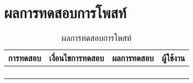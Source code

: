 \section{ผลการทดสอบการโพสท์}
\begin{table}[H]
	\caption{ผลการทดสอบการโพสท์}
    \centering	
	\label{tab:test10}
    \begin{tabular}{ | p{4cm} | p{4cm} | p{4cm} | p{2cm} | }
		\hline
	\multicolumn{1}{|c|}{การทดสอบ} & \multicolumn{1}{c|}{เงื่อนไขการทดสอบ} & \multicolumn{1}{c|}{ผลการทดสอบ} & \multicolumn{1}{c|}{ผู้ใช้งาน}                             \\ \hline
	\setstretch{1.0}{ทดสอบการโพสท์}
	& \setstretch{1.0}{ผู้ใช้กดโพสท์โดยไม่ระบุข้อความ}
	& \setstretch{1.0}{ระบบจะแสดงข้อความ  กรุณาระบุข้อความให้ถูกต้อง  } 
	&\setstretch{1.0}{\begin{flushleft}ผู้ใช้งาน\end{flushleft}} \\ \cline{2-3} 
	& \setstretch{1.0}{ผู้ใช้โพสท์โดยกรอกข้อความ และไม่เพิ่มรูปภาพ} 
	& \setstretch{1.0}{ระบบจะบันทึกข้อมูลเฉพาะข้อความ} 
	&\setstretch{1.0}{}\\ \cline{2-3} 
	& \setstretch{1.0}{ผู้ใช้โพสท์โดยกรอกข้อความ และเพิ่มรูปภาพ} 
	& \setstretch{1.0}{ระบบจะบันทึกข้อมูลข้อความและรูปภาพ} 
	&\setstretch{1.0}{}\\ \cline{2-3} 
	& \setstretch{1.0}{ผู้ใช้โพสท์โดยไม่เลือกประเภท} 
	& \setstretch{1.0}{ระบบจะแสดงข้อความ  กรุณาเลือกประเภท } 
	&\setstretch{1.0}{}\\ \cline{2-3} \hline
    \end{tabular}
\end{table}

